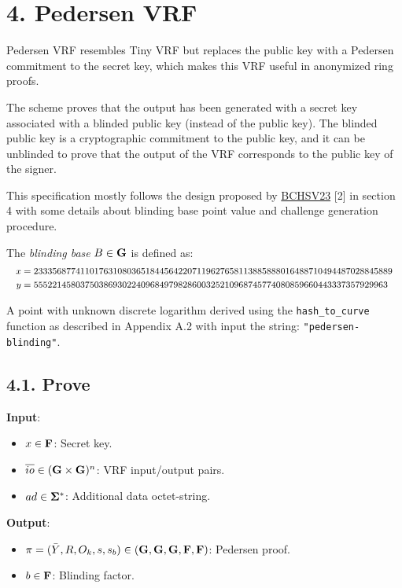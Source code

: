 \documentclass[
]{article}
\providecommand{\tightlist}{%
  \setlength{\itemsep}{0pt}\setlength{\parskip}{0pt}}
\begin{document}
\section{4. Pedersen VRF}\label{pedersen-vrf}

Pedersen VRF resembles Tiny VRF but replaces the public key with a
Pedersen commitment to the secret key, which makes this VRF useful in
anonymized ring proofs.

The scheme proves that the output has been generated with a secret key
associated with a blinded public key (instead of the public key). The
blinded public key is a cryptographic commitment to the public key, and
it can be unblinded to prove that the output of the VRF corresponds to
the public key of the signer.

This specification mostly follows the design proposed by
\href{https://eprint.iacr.org/2023/002}{BCHSV23} {[}2{]} in section 4
with some details about blinding base point value and challenge
generation procedure.

The \emph{blinding base} \(B \in \bold{G}\) is defined as:
\[\footnotesize\begin{aligned}
x &= 23335687741101763108036518445642207119627658113885888016488710494487028845889 \\
y &= 5552214580375038693022409684979828600325210968745774080859660443337357929963
\end{aligned}\]

A point with unknown discrete logarithm derived using the
\texttt{hash\_to\_curve} function as described in Appendix A.2 with
input the string: \texttt{"pedersen-blinding"}.

\subsection{4.1. Prove}\label{prove-2}

\textbf{Input}:

\begin{itemize}
\tightlist
\item
  \(x \in \bold{F}\): Secret key.
\item
  \(\overline{io} \in (\bold{G}\times \bold{G})^n\): VRF input/output
  pairs.
\item
  \(ad \in \bold{\Sigma}^*\): Additional data octet-string.
\end{itemize}

\textbf{Output}:

\begin{itemize}
\tightlist
\item
  \(\pi = (\bar{Y}, R, O_k, s, s_b) \in (\bold{G}, \bold{G}, \bold{G}, \bold{F}, \bold{F})\):
  Pedersen proof.
\item
  \(b \in \bold{F}\): Blinding factor.
\end{itemize}
\end{document}
